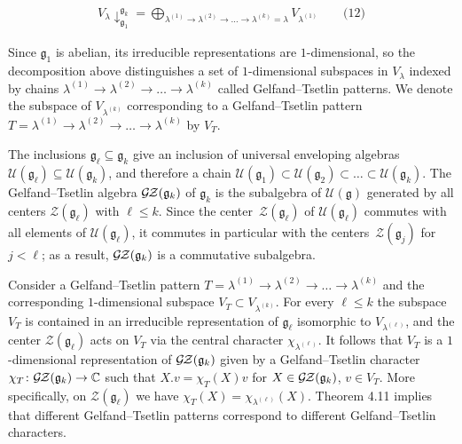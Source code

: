 \documentclass[10pt,a4paper]{article}
\begin{document}
\[\begin{aligned}
\displaystyle V_{\lambda}{\downarrow}^{\mathfrak{g}_{k}}_{\mathfrak{g}_{1}}=\bigoplus_{\lambda^{(1)}\to\lambda^{(2)}\to\dots\to\lambda^{(k)}=\lambda}V_{\lambda^{(1)}}\qquad\text{(12)}
\end{aligned}\]


Since $\mathfrak{g}_{1}$ is abelian, its irreducible representations are $1$-dimensional, so the decomposition above distinguishes a set of $1$-dimensional subspaces in $V_{\lambda}$ indexed by chains $\lambda^{(1)}\to\lambda^{(2)}\to\dots\to\lambda^{(k)}$ called Gelfand–Tsetlin patterns.
We denote the subspace of $V_{\lambda^{(k)}}$ corresponding to a Gelfand–Tsetlin pattern $T=\lambda^{(1)}\to\lambda^{(2)}\to\dots\to\lambda^{(k)}$ by $V_{T}$.





The inclusions $\mathfrak{g}_{\ell}\subseteq\mathfrak{g}_{k}$ give an inclusion of universal enveloping algebras $\mathcal{U}(\mathfrak{g}_{\ell})\subseteq\mathcal{U}(\mathfrak{g}_{k})$, and therefore a chain $\mathcal{U}(\mathfrak{g}_{1})\subset\mathcal{U}(\mathfrak{g}_{2})\subset\dots\subset\mathcal{U}(\mathfrak{g}_{k})$. The Gelfand–Tsetlin algebra $\mathcal{G}\hskip-1.00006pt\mathcal{Z}(\mathfrak{g}_{k})$ of $\mathfrak{g}_{k}$ is the subalgebra of $\mathcal{U}(\mathfrak{g})$ generated by all centers $\mathcal{Z}(\mathfrak{g}_{\ell})$ with $\ell\leq k$. Since the center $\mathcal{Z}(\mathfrak{g}_{\ell})$ of $\mathcal{U}(\mathfrak{g}_{\ell})$ commutes with all elements of $\mathcal{U}(\mathfrak{g}_{\ell})$, it commutes in particular with the centers $\mathcal{Z}(\mathfrak{g}_{j})$ for $j<\ell$; as a result, $\mathcal{G}\hskip-1.00006pt\mathcal{Z}(\mathfrak{g}_{k})$ is a commutative subalgebra.





Consider a Gelfand–Tsetlin pattern $T=\lambda^{(1)}\to\lambda^{(2)}\to\dots\to\lambda^{(k)}$ and the corresponding $1$-dimensional subspace $V_{T}\subset V_{\lambda^{(k)}}$.
For every $\ell\leq k$ the subspace $V_{T}$ is contained in an irreducible representation of $\mathfrak{g}_{\ell}$ isomorphic to $V_{\lambda^{(\ell)}}$, and the center $\mathcal{Z}(\mathfrak{g}_{\ell})$ acts on $V_{T}$ via the central character $\chi_{\lambda^{(\ell)}}$.
It follows that $V_{T}$ is a $1$-dimensional representation of $\mathcal{G}\hskip-1.00006pt\mathcal{Z}(\mathfrak{g}_{k})$ given by a Gelfand–Tsetlin character $\chi_{T}\colon\mathcal{G}\hskip-1.00006pt\mathcal{Z}(\mathfrak{g}_{k})\to\mathbb{C}$ such that $X.v=\chi_{T}(X)v$ for $X\in\mathcal{G}\hskip-1.00006pt\mathcal{Z}(\mathfrak{g}_{k})$, $v\in V_{T}$.
More specifically, on $\mathcal{Z}(\mathfrak{g}_{\ell})$ we have $\chi_{T}(X)=\chi_{\lambda^{(\ell)}}(X)$.
Theorem 4.11 implies that different Gelfand–Tsetlin patterns correspond to different Gelfand–Tsetlin characters.
\end{document}
